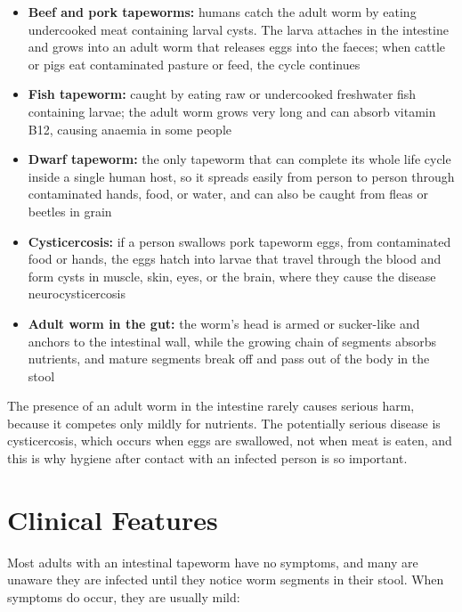 \begin{itemize}
    \item \textbf{Beef and pork tapeworms:} humans catch the adult worm by eating undercooked meat containing larval cysts. The larva attaches in the intestine and grows into an adult worm that releases eggs into the faeces; when cattle or pigs eat contaminated pasture or feed, the cycle continues
    \item \textbf{Fish tapeworm:} caught by eating raw or undercooked freshwater fish containing larvae; the adult worm grows very long and can absorb vitamin B12, causing anaemia in some people
    \item \textbf{Dwarf tapeworm:} the only tapeworm that can complete its whole life cycle inside a single human host, so it spreads easily from person to person through contaminated hands, food, or water, and can also be caught from fleas or beetles in grain
    \item \textbf{Cysticercosis:} if a person swallows pork tapeworm eggs, from contaminated food or hands, the eggs hatch into larvae that travel through the blood and form cysts in muscle, skin, eyes, or the brain, where they cause the disease neurocysticercosis
    \item \textbf{Adult worm in the gut:} the worm's head is armed or sucker-like and anchors to the intestinal wall, while the growing chain of segments absorbs nutrients, and mature segments break off and pass out of the body in the stool
\end{itemize}

The presence of an adult worm in the intestine rarely causes serious harm, because it competes only mildly for nutrients. The potentially serious disease is cysticercosis, which occurs when eggs are swallowed, not when meat is eaten, and this is why hygiene after contact with an infected person is so important.

\section*{Clinical Features}
Most adults with an intestinal tapeworm have no symptoms, and many are unaware they are infected until they notice worm segments in their stool. When symptoms do occur, they are usually mild:

